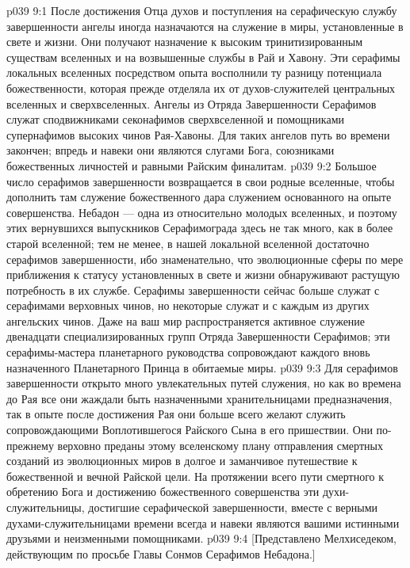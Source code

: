 \vs p039 9:1 После достижения Отца духов и поступления на серафическую службу завершенности ангелы иногда назначаются на служение в миры, установленные в свете и жизни. Они получают назначение к высоким тринитизированным существам вселенных и на возвышенные службы в Рай и Хавону. Эти серафимы локальных вселенных посредством опыта восполнили ту разницу потенциала божественности, которая прежде отделяла их от духов\hyp{}служителей центральных вселенных и сверхвселенных. Ангелы из Отряда Завершенности Серафимов служат сподвижниками секонафимов сверхвселенной и помощниками супернафимов высоких чинов Рая\hyp{}Хавоны. Для таких ангелов путь во времени закончен; впредь и навеки они являются слугами Бога, союзниками божественных личностей и равными Райским финалитам.
\vs p039 9:2 Большое число серафимов завершенности возвращается в свои родные вселенные, чтобы дополнить там служение божественного дара служением основанного на опыте совершенства. Небадон --- одна из относительно молодых вселенных, и поэтому этих вернувшихся выпускников Серафимограда здесь не так много, как в более старой вселенной; тем не менее, в нашей локальной вселенной достаточно серафимов завершенности, ибо знаменательно, что эволюционные сферы по мере приближения к статусу установленных в свете и жизни обнаруживают растущую потребность в их службе. Серафимы завершенности сейчас больше служат с серафимами верховных чинов, но некоторые служат и с каждым из других ангельских чинов. Даже на ваш мир распространяется активное служение двенадцати специализированных групп Отряда Завершенности Серафимов; эти серафимы\hyp{}мастера планетарного руководства сопровождают каждого вновь назначенного Планетарного Принца в обитаемые миры.
\vs p039 9:3 Для серафимов завершенности открыто много увлекательных путей служения, но как во времена до Рая все они жаждали быть назначенными хранительницами предназначения, так в опыте после достижения Рая они больше всего желают служить сопровождающими Воплотившегося Райского Сына в его пришествии. Они по\hyp{}прежнему верховно преданы этому вселенскому плану отправления смертных созданий из эволюционных миров в долгое и заманчивое путешествие к божественной и вечной Райской цели. На протяжении всего пути смертного к обретению Бога и достижению божественного совершенства эти духи\hyp{}служительницы, достигшие серафической завершенности, вместе с верными духами\hyp{}служительницами времени всегда и навеки являются вашими истинными друзьями и неизменными помощниками.
\vsetoff
\vs p039 9:4 [Представлено Мелхиседеком, действующим по просьбе Главы Сонмов Серафимов Небадона.]
